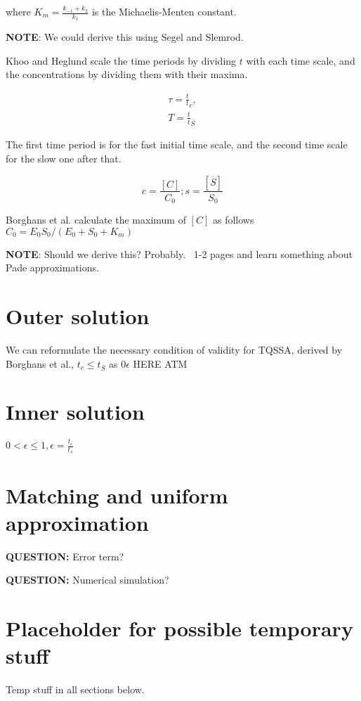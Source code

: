 \documentclass[12pt]{report}
\begin{document}
where $K_m = \frac{k_{-1} + k_{2}}{k_1}$ is the Michaelis-Menten constant.

\textbf{NOTE}: We could derive this using Segel and Slemrod.

Khoo and Heglund scale the time periods by dividing $t$ with each time scale, and the concentrations by dividing them with their maxima.

\begin{align*}
\tau = \frac t t_c, \\
T = \frac t t_{\overline{S}}
\end{align*}

The first time period is for the fast initial time scale, and the second time scale for the slow one after that.

\begin{equation}
c = \frac{[C]}{C_0}; s = \frac{[\overline{S}]}{S_0}
\end{equation}

Borghans et al. calculate the maximum of $[C]$ as follows $C_0 = E_0S_0 / (E_0 + S_0 + K_m)$

\textbf{NOTE}: Should we derive this? Probably. ~1-2 pages and learn something about Pade approximations.

\section{Outer solution}

We can reformulate the necessary condition of validity for TQSSA, derived by Borghans et al., $t_c \leq t_{\overline{S}}$ as $0\epsilon$ HERE ATM

\section{Inner solution}

$0 < \epsilon \leq 1, \epsilon = \frac{t_{\epsilon}}{t_{s}}$

\section{Matching and uniform approximation}

\textbf{QUESTION: } Error term?

\textbf{QUESTION: } Numerical simulation?

\section{Placeholder for possible temporary stuff}
Temp stuff in all sections below.
\end{document}
